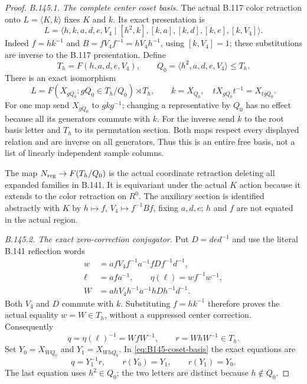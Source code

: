 \begin{proof}
\emph{B.145.1. The complete center coset basis.}
The actual B.117 color retraction onto $L=\langle K,k\rangle$
fixes $K$ and $k$. Its exact presentation is
\begin{equation}\label{eq:B145-L}
 L=\langle h,k,a,d,e,V_4\mid
 [h^2,k],[k,a],[k,d],[k,e],[k,V_4]\rangle.
\end{equation}
Indeed $f=hk^{-1}$ and
$B=fV_4f^{-1}=hV_4h^{-1}$, using $[k,V_4]=1$; these substitutions
are inverse to the B.117 presentation. Define
\[
 T_h=F(h,a,d,e,V_4),\qquad Q_0=\langle h^2,a,d,e,V_4\rangle\leq T_h.
\]
There is an exact isomorphism
\begin{equation}\label{eq:B145-coset-basis}
 L=F(X_{gQ_0}:gQ_0\in T_h/Q_0)\rtimes T_h,
 \qquad k=X_{Q_0},\quad tX_{gQ_0}t^{-1}=X_{tgQ_0}.
\end{equation}
For one map send $X_{gQ_0}$ to $gkg^{-1}$; changing a representative
by $Q_0$ has no effect because all its generators commute with $k$.
For the inverse send $k$ to the root basis letter and $T_h$ to its
permutation section. Both maps respect every displayed relation
and are inverse on all generators. Thus this is an entire free
basis, not a list of linearly independent sample columns.

The map $N_{\rm reg}\to F(T_h/Q_0)$ is the actual coordinate
retraction deleting all expanded families in B.141. It is equivariant
under the actual $K$ action because it extends to the color
retraction on $R^0$. The auxiliary section is identified abstractly
with $K$ by $h\mapsto f$, $V_4\mapsto f^{-1}Bf$, fixing $a,d,e$;
$h$ and $f$ are not equated in the actual region.

\emph{B.145.2. The exact zero-correction conjugator.}
Put $D=ded^{-1}$ and use the literal B.141 reflection words
\begin{equation}\label{eq:B145-W}
\begin{split}
 w&=afV_4f^{-1}a^{-1}fDf^{-1}d^{-1},\\
 \ell&=afa^{-1},\qquad \eta(\ell)=wf^{-1}w^{-1},\\
 W&=ahV_4h^{-1}a^{-1}hDh^{-1}d^{-1}.
\end{split}
\end{equation}
Both $V_4$ and $D$ commute with $k$. Substituting $f=hk^{-1}$
therefore proves the actual equality $w=W\in T_h$, without a
suppressed center correction. Consequently
\[
 q=\eta(\ell)^{-1}=WfW^{-1},\qquad r=WhW^{-1}\in T_h.
\]
Set $Y_0=X_{WQ_0}$ and $Y_1=X_{WhQ_0}$. In
\eqref{eq:B145-coset-basis} the exact equations are
\begin{equation}\label{eq:B145-q}
 q=Y_1^{-1}r,\qquad r(Y_0)=Y_1,\qquad r(Y_1)=Y_0.
\end{equation}
The last equation uses $h^2\in Q_0$; the two letters are distinct
because $h\notin Q_0$.


\end{proof}
